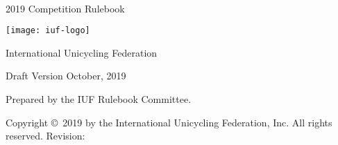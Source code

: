 \begin{titlepage}
\centering
\ \\
\vspace{5cm}
{\Huge 2019 Competition Rulebook}
\vspace{5mm}

\texttt{[image: iuf-logo]}

\vspace{5mm}
{\huge International Unicycling Federation}

\vspace{5mm}
{\Large Draft Version \quad October, 2019}

\vspace{45mm}
Prepared by the IUF Rulebook Committee.

\vspace{5mm}
{\small Copyright \copyright\ 2019 by the International Unicycling Federation, Inc. All rights reserved.}
\small{Revision: \href{https://github.com/iuf/rulebook/commit/\gitHash}{\gitAbbrevHash} \ \gitCommitterDate}

\end{titlepage}
